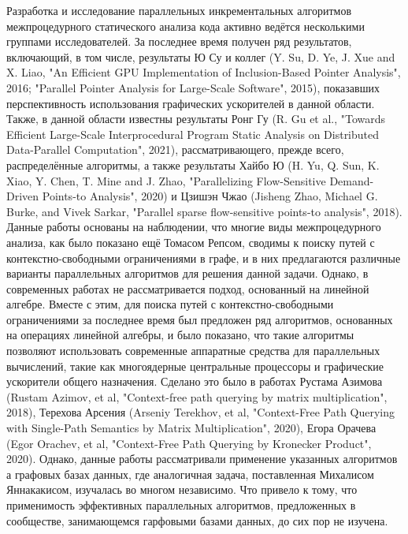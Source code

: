 \documentclass[12pt]{article}  %
\theoremstyle{remark}
\begin{document}
Разработка и исследование параллельных инкрементальных алгоритмов межпроцедурного статического анализа кода активно ведётся несколькими группами исследователей. За последнее время получен ряд результатов, включающий, в том числе, результаты Ю Су и коллег (Y. Su, D. Ye, J. Xue and X. Liao, "An Efficient GPU Implementation of Inclusion-Based Pointer Analysis", 2016; "Parallel Pointer Analysis for Large-Scale Software", 2015), показавших перспективность использования графических ускорителей в данной области. Также, в данной области известны результаты Ронг Гу (R. Gu et al., "Towards Efficient Large-Scale Interprocedural Program Static Analysis on Distributed Data-Parallel Computation", 2021), рассматривающего, прежде всего, распределённые алгоритмы, а также результаты Хайбо Ю (H. Yu, Q. Sun, K. Xiao, Y. Chen, T. Mine and J. Zhao, "Parallelizing Flow-Sensitive Demand-Driven Points-to Analysis", 2020) и  Цзишэн Чжао (Jisheng Zhao, Michael G. Burke, and Vivek Sarkar, "Parallel sparse flow-sensitive points-to analysis", 2018). Данные работы основаны на наблюдении, что многие виды межпроцедурного анализа, как было показано ещё Томасом Репсом, сводимы к поиску путей с контекстно-свободными ограничениями в графе, и в них предлагаются различные варианты параллельных алгоритмов для решения данной задачи. Однако, в современных работах не рассматривается подход, основанный на линейной алгебре. Вместе с этим, для поиска путей с контекстно-свободными ограничениями за последнее время был предложен ряд алгоритмов, основанных на операциях линейной алгебры, и было показано, что такие алгоритмы позволяют использовать современные аппаратные средства для параллельных вычислений, такие как многоядерные центральные процессоры и графические ускорители общего назначения. Сделано это было в работах Рустама Азимова (Rustam Azimov, et al, "Context-free path querying by matrix multiplication", 2018), Терехова Арсения (Arseniy Terekhov, et al, "Context-Free Path Querying with Single-Path Semantics by Matrix Multiplication", 2020), Егора Орачева (Egor Orachev, et al, "Context-Free Path Querying by Kronecker Product", 2020). Однако, данные работы рассматривали применение указанных алгоритмов а графовых базах данных, где аналогичная задача, поставленная Михалисом Яннакакисом, изучалась во многом независимо. Что привело к тому, что применимость эффективных параллельных алгоритмов, предложенных в сообществе, занимающемся гарфовыми базами данных, до сих пор не изучена.
\end{document}
